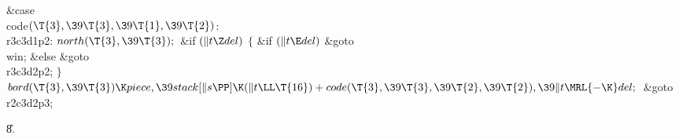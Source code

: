 \&{case} \\{code}${}(\T{3},\39\T{3},\39\T{1},\39\T{2}){}$:\5
\\{r3c3d1p2}:\5
${}\\{north}(\T{3},\39\T{3});{}$\6
\&{if} ${}(\|t\Z\\{del}){}$\5
${}\{{}$\5
\1\&{if} ${}(\|t\E\\{del}){}$\1\5
\&{goto} \\{win};\5
\2\&{else}\1\5
\&{goto} \\{r3c3d2p2};\5
\2${}\}{}$\2\6
${}\\{bord}(\T{3},\39\T{3})\K\\{piece},\39\\{stack}[\|s\PP]\K(\|t\LL\T{16})+%
\\{code}(\T{3},\39\T{3},\39\T{2},\39\T{2}),\39\|t\MRL{-{\K}}\\{del};{}$\6
\&{goto} \\{r2c3d2p3};\par
\U8.\fi

